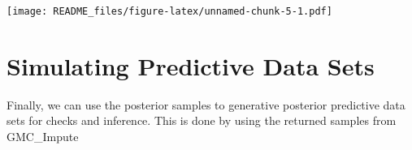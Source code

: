 \documentclass[
]{article}
\newenvironment{Shaded}{\begin{snugshade}}{\end{snugshade}}
\newcommand{\AttributeTok}[1]{\textcolor[rgb]{0.77,0.63,0.00}{#1}}
\newcommand{\DecValTok}[1]{\textcolor[rgb]{0.00,0.00,0.81}{#1}}
\newcommand{\FloatTok}[1]{\textcolor[rgb]{0.00,0.00,0.81}{#1}}
\newcommand{\FunctionTok}[1]{\textcolor[rgb]{0.00,0.00,0.00}{#1}}
\newcommand{\NormalTok}[1]{#1}
\newcommand{\SpecialCharTok}[1]{\textcolor[rgb]{0.00,0.00,0.00}{#1}}
\newcommand{\StringTok}[1]{\textcolor[rgb]{0.31,0.60,0.02}{#1}}
\begin{document}
\begin{Shaded}
\end{Shaded}

\texttt{[image: README\_files/figure-latex/unnamed-chunk-5-1.pdf]}

\hypertarget{simulating-predictive-data-sets}{%
\section{Simulating Predictive Data
Sets}\label{simulating-predictive-data-sets}}

Finally, we can use the posterior samples to generative posterior
predictive data sets for checks and inference. This is done by using the
returned samples from GMC\_Impute
\end{document}
